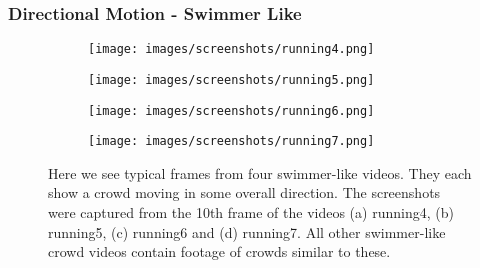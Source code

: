\documentclass[10pt]{article}
\begin{document}
\subsubsection{Directional Motion - Swimmer Like}
\begin{figure}[H]
\begin{subfigure}[t]{.49\textwidth}
  \centering
  \texttt{[image: images/screenshots/running4.png]}
  \label{fig:running4_screenshot}
  \caption{}
\end{subfigure}%
\hfill
\begin{subfigure}[t]{.49\textwidth}
  \centering
  \texttt{[image: images/screenshots/running5.png]}
  \label{fig:running5_screenshot}
  \caption{}
\end{subfigure}
\par\bigskip
\begin{subfigure}[t]{.49\textwidth}
  \centering
  \texttt{[image: images/screenshots/running6.png]}
  \label{fig:running6_screenshot}
  \caption{}
\end{subfigure}%
\hfill
\begin{subfigure}[t]{.49\textwidth}
  \centering
  \texttt{[image: images/screenshots/running7.png]}
  \label{fig:running7_screenshot}
  \caption{}
\end{subfigure}%
\caption{Here we see typical frames from four swimmer-like videos. They each show a crowd moving in some overall direction. The screenshots were captured from the 10th frame of the videos (a) running4, (b) running5, (c) running6 and (d) running7. All other swimmer-like crowd videos contain footage of crowds similar to these.}
\label{fig:running_screenshots}
\end{figure}
\end{document}
